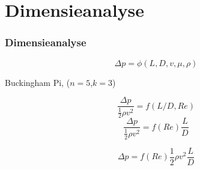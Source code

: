 \documentclass[t]{beamer}
\begin{document}
  	\section{Dimensieanalyse}
  	\begin{frame}
		\frametitle{Dimensieanalyse}
		\begin{equation*}
			\Delta p = \phi(L,D,v,\mu,\rho)
		\end{equation*}
		\pause
		
		Buckingham Pi, ($n=5$,$k=3$)
		
		\pause
		\begin{equation*}
			\frac{\Delta p}{\frac{1}{2}\rho v^2} = f(L/D,Re)
		\end{equation*}
		\pause
		\begin{equation*}
			\frac{\Delta p}{\frac{1}{2}\rho v^2} = f(Re) \frac{L}{D}
		\end{equation*}
		\pause
		
		\begin{equation}
			\Delta p = f(Re) \frac{1}{2}\rho v^2 \frac{L}{D}
		\end{equation}
	\end{frame}
\end{document}
